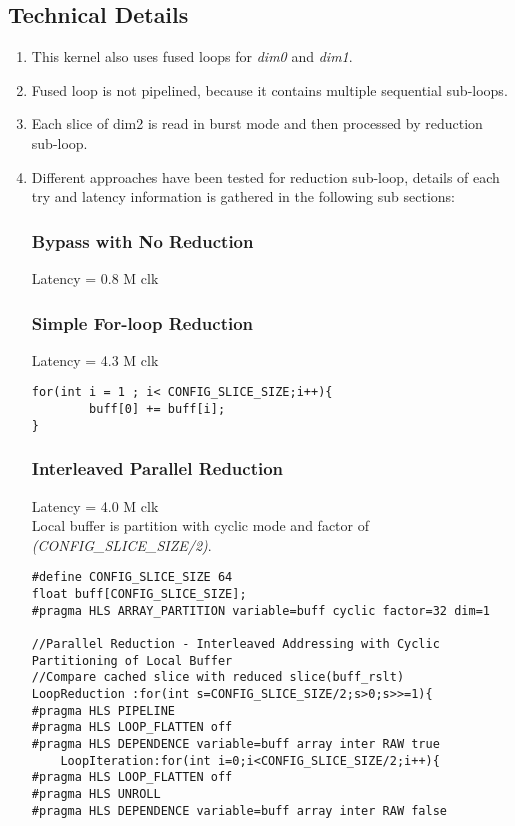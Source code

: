 \subsection{Technical Details}
\begin{enumerate}
\item This kernel also uses fused loops for \emph{dim0} and \emph{dim1}.

\item Fused loop is not pipelined, because it contains multiple sequential sub-loops.

\item Each slice of dim2 is read in burst mode and then processed by reduction sub-loop.

\item Different approaches have been tested for reduction sub-loop, details of each try and latency information is gathered in the following sub sections:

\subsubsection{Bypass with No Reduction}
Latency = 0.8 M clk

\subsubsection{Simple For-loop Reduction}
Latency = 4.3 M clk
\begin{lstlisting}
for(int i = 1 ; i< CONFIG_SLICE_SIZE;i++){
    	buff[0] += buff[i];
}
\end{lstlisting}

\subsubsection{Interleaved Parallel Reduction}
Latency = 4.0 M clk \\
Local buffer is partition with cyclic mode and factor of \emph{(CONFIG\_SLICE\_SIZE/2)}.

\begin{lstlisting}
#define CONFIG_SLICE_SIZE 64
float buff[CONFIG_SLICE_SIZE];
#pragma HLS ARRAY_PARTITION variable=buff cyclic factor=32 dim=1

//Parallel Reduction - Interleaved Addressing with Cyclic Partitioning of Local Buffer
//Compare cached slice with reduced slice(buff_rslt)
LoopReduction :for(int s=CONFIG_SLICE_SIZE/2;s>0;s>>=1){
#pragma HLS PIPELINE
#pragma HLS LOOP_FLATTEN off
#pragma HLS DEPENDENCE variable=buff array inter RAW true
	LoopIteration:for(int i=0;i<CONFIG_SLICE_SIZE/2;i++){
#pragma HLS LOOP_FLATTEN off
#pragma HLS UNROLL
#pragma HLS DEPENDENCE variable=buff array inter RAW false


\end{lstlisting}
\end{enumerate}
